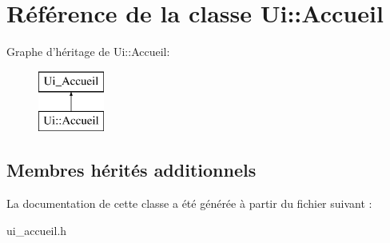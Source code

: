 \hypertarget{class_ui_1_1_accueil}{\section{Référence de la classe Ui\+:\+:Accueil}
\label{class_ui_1_1_accueil}
}
Graphe d'héritage de Ui\+:\+:Accueil\+:\begin{figure}[H]
\begin{center}
\leavevmode
\includegraphics[height=2.000000cm]{class_ui_1_1_accueil}
\end{center}
\end{figure}
\subsection*{Membres hérités additionnels}


La documentation de cette classe a été générée à partir du fichier suivant \+:\begin{DoxyCompactItemize}
\item 
ui\+\_\+accueil.\+h\end{DoxyCompactItemize}
